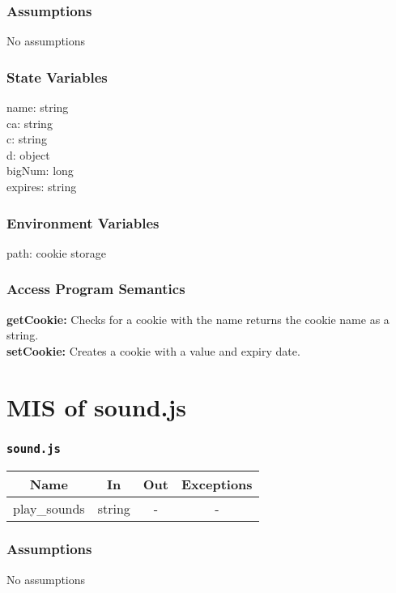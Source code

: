 \documentclass[11pt, oneside]{article}   	%
\begin{document}
\subsubsection*{Assumptions}
No assumptions

\subsubsection*{State Variables}
name: string\\
ca: string\\
c: string\\
d: object\\
bigNum: long\\
expires: string\\
\subsubsection*{Environment Variables}
path: cookie storage

\subsubsection*{Access Program Semantics} 
 \textbf{getCookie:} Checks for a cookie with the name returns the cookie name as a string.\\
 \textbf{setCookie:} Creates a cookie with a value and expiry date.




\section*{MIS of sound.js}
\subsubsection*{\texttt{sound.js}}



\begin{center}
\begin{tabular}{ |c|c|c|c| } 
 \hline
 Name & In & Out & Exceptions \\ 
 \hline \hline
 play\_sounds & string & - & - \\ 
 \hline
\end{tabular}
\end{center}

\subsubsection*{Assumptions}
No assumptions
\end{document}
